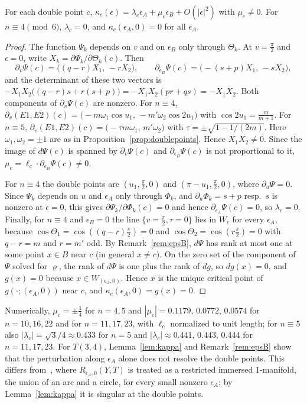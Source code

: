 \begin{lemma}\label{lem:kappa}
For each double point $c$, $\kappa_c(\epsilon)=\lambda_c\epsilon_A+\mu_c\epsilon_B+O(|\epsilon|^2)$ with $\mu_c\ne0$. For $n\equiv4\pmod 6$,
$\lambda_c=0$, and $\kappa_c(\epsilon_A,0)=0$ for all $\epsilon_A$.
\end{lemma}

\begin{proof}
The function $\Psi_k$ depends on $v$ and on $\epsilon_B$ only through $\Theta_k$. At $v=\frac\pi2$ and $\epsilon=0$, write
$X_k=\partial\Psi_k/\partial\Theta_k(c)$. Then
$$\partial_v\Psi(c)=\bigl((q-r)X_1,\,-rX_2\bigr),\qquad \partial_{\epsilon_B}\Psi(c)=\bigl(-(s+p)X_1,\,-sX_2\bigr),$$
and the determinant of these two vectors is $-X_1X_2\bigl((q-r)s+r(s+p)\bigr)=-X_1X_2(pr+qs)=-X_1X_2$. Both components
of $\partial_v\Psi(c)$ are nonzero. For $n\equiv4$, $\partial_v(E1,E2)(c)=\bigl(-m\omega_1\cos u_1,\,-m'\omega_2\cos2u_1\bigr)$ with
$\cos2u_1=\frac m{m+1}$. For $n\equiv5$, $\partial_v(E1,E2)(c)=\bigl(-\tau m\omega_1,\,m'\omega_2\bigr)$ with $\tau=\pm\sqrt{1-1/(2m)}$. Here
$\omega_1,\omega_2=\pm1$ are as in Proposition~\ref{prop:doublepoints}. Hence $X_1X_2\ne0$. Since the image of
$d\Psi(c)$ is spanned by $\partial_v\Psi(c)$ and $\partial_{\epsilon_B}\Psi(c)$ is not proportional to it, $\mu_c=\ell_c\cdot\partial_{\epsilon_B}\Psi(c)\ne0$.

For $n\equiv4$ the double points are $(u_1,\frac\pi2,0)$ and $(\pi-u_1,\frac\pi2,0)$, where $\partial_u\Psi=0$. Since $\Psi_k$ depends
on $u$ and $\epsilon_A$ only through $\Phi_k$, and $\partial_u\Phi_k=s+p$ resp.\ $s$ is nonzero at $\epsilon=0$, this gives
$\partial\Psi_k/\partial\Phi_k(c)=0$ and hence $\partial_{\epsilon_A}\Psi(c)=0$, so $\lambda_c=0$. Finally, for $n\equiv4$ and $\epsilon_B=0$ the line
$\{v=\frac\pi2,\tau=0\}$ lies in $W_\epsilon$ for every $\epsilon_A$, because $\cos\Theta_1=\cos((q-r)\frac\pi2)=0$ and
$\cos\Theta_2=\cos(r\frac\pi2)=0$ with $q-r=m$ and $r=m'$ odd. By Remark~\ref{rem:epsB}, $d\Psi$ has rank at most one at some point $x\in B$ near $c$
(in general $x\neq c$). On the zero set of the component of $\Psi$ solved for $\varrho$, the rank of $d\Psi$ is one plus the
rank of $dg$, so $dg(x)=0$, and $g(x)=0$ because $x\in W_{(\epsilon_A,0)}$. Hence $x$ is the unique critical point of
$g(\cdot;(\epsilon_A,0))$ near $c$, and $\kappa_c(\epsilon_A,0)=g(x)=0$.
\end{proof}

Numerically, $\mu_c=\pm\frac14$ for $n=4,5$ and $|\mu_c|=0.1179,\,0.0772,\,0.0574$ for $n=10,16,22$ and for $n=11,17,23$,
with $\ell_c$ normalized to unit length; for $n\equiv5$ also $|\lambda_c|=\sqrt3/4\approx0.433$ for $n=5$ and
$|\lambda_c|\approx0.441,\,0.443,\,0.444$ for $n=11,17,23$. For $T(3,4)$, Lemma~\ref{lem:kappa} and Remark~\ref{rem:epsB} show
that the perturbation along $\epsilon_A$ alone does not resolve the double points. This differs from~\cite[\S11.6]{HHK2},
where $R_{\epsilon_A,0}(Y,T)$ is treated as a restricted immersed $1$-manifold, the union of an arc and a circle, for every
small nonzero $\epsilon_A$; by Lemma~\ref{lem:kappa} it is singular at the double points.

